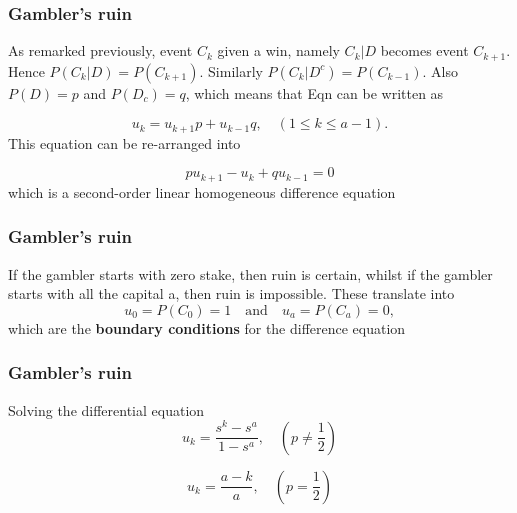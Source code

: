 \documentclass[spanish]{beamer}
\begin{document}
\begin{frame}
\frametitle{Gambler’s ruin}
As remarked previously, event $C_{k}$ given a win, namely $C_{k} \vert D$ becomes event $C_{k+1}$. Hence $P(C_{k} \vert D) = P(C_{k+1} )$. Similarly $P(C_{k} \vert D^{c} ) = P(C_{k-1} )$. Also $P(D) = p$ and $P(D_{c}) = q$, which means that Eqn can be written as

\begin{equation*}
u_{k} = u_{k+1} p + u_{k-1} q, \quad (1 \leq k \leq a -1).
\end{equation*}
This equation can be re-arranged into

\begin{equation*}
 p u_{k+1} -u_{k}+ qu_{k-1} = 0
\end{equation*}
which is a second-order linear homogeneous difference equation

\end{frame}

\begin{frame}
\frametitle{Gambler’s ruin}
If the gambler starts with zero stake, then ruin is certain, whilst if the gambler starts with all the capital a, then ruin is impossible. These translate into
\begin{equation*}
u_{0} = P(C_{0}) = 1 \quad \text{and} \quad u_{a} = P(C_{a}) = 0,
\end{equation*}
which are the \textbf{boundary conditions} for the difference equation
\end{frame}
\begin{frame}
\frametitle{Gambler’s ruin}
Solving the differential equation
\begin{equation*}
u_{k}=\frac{s^k-s^a}{1-s^a}, \quad (p\neq \frac{1}{2} )
\end{equation*}

\begin{equation*}
u_{k}=\frac{a-k}{a}, \quad (p= \frac{1}{2} )
\end{equation*}

\end{frame}

\end{document}
